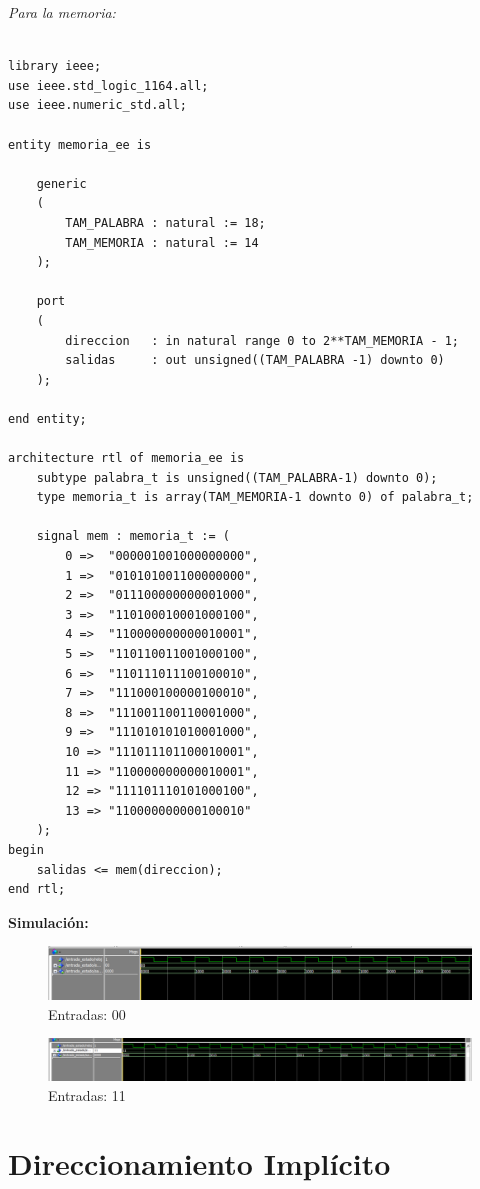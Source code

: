 \documentclass[12pt]{article}
\begin{document}
\bigskip
\textit{Para la memoria:}
\begin{lstlisting}

library ieee;
use ieee.std_logic_1164.all;
use ieee.numeric_std.all;

entity memoria_ee is

	generic 
	(
		TAM_PALABRA : natural := 18;
		TAM_MEMORIA : natural := 14
	);

	port 
	(
		direccion	: in natural range 0 to 2**TAM_MEMORIA - 1;
		salidas		: out unsigned((TAM_PALABRA -1) downto 0)
	);

end entity;

architecture rtl of memoria_ee is
	subtype palabra_t is unsigned((TAM_PALABRA-1) downto 0);
	type memoria_t is array(TAM_MEMORIA-1 downto 0) of palabra_t;
	
	signal mem : memoria_t := (
		0 =>  "000001001000000000",
		1 =>  "010101001100000000",
		2 =>  "011100000000001000",
		3 =>  "110100010001000100",
		4 =>  "110000000000010001",
		5 =>  "110110011001000100",
		6 =>  "110111011100100010",
		7 =>  "111000100000100010",
		8 =>  "111001100110001000",
		9 =>  "111010101010001000",
		10 => "111011101100010001",
		11 => "110000000000010001",
		12 => "111101110101000100",
		13 => "110000000000100010"
	);
begin
	salidas <= mem(direccion);
end rtl;

\end{lstlisting}
\bigskip
\textbf{Simulaci\'on:}

\begin{figure}[H]
	\centering
	\includegraphics[width=1.0\textwidth]{input_00_ee}
	\caption{Entradas: 00}
\end{figure}

\begin{figure}[H]
	\centering
	\includegraphics[width=1.0\textwidth]{input_11_ee}
	\caption{Entradas: 11}
\end{figure}

\newpage
\section{Direccionamiento Impl\'icito}
\end{document}
